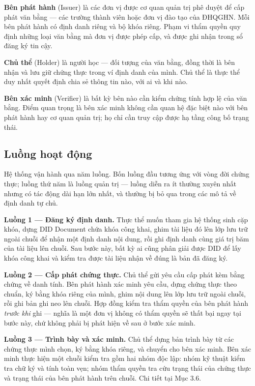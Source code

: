 \textbf{Bên phát hành} (Issuer) là các đơn vị được cơ quan quản trị phê duyệt để cấp phát văn bằng --- các trường thành viên hoặc đơn vị đào tạo của ĐHQGHN. Mỗi bên phát hành có định danh riêng và bộ khóa riêng. Phạm vi thẩm quyền quy định những loại văn bằng mà đơn vị được phép cấp, và được ghi nhận trong sổ đăng ký tin cậy.

\textbf{Chủ thể} (Holder) là người học --- đối tượng của văn bằng, đồng thời là bên nhận và lưu giữ chứng thực trong ví định danh của mình. Chủ thể là thực thể duy nhất quyết định chia sẻ thông tin nào, với ai và khi nào.

\textbf{Bên xác minh} (Verifier) là bất kỳ bên nào cần kiểm chứng tính hợp lệ của văn bằng. Điểm quan trọng là bên xác minh không cần quan hệ đặc biệt nào với bên phát hành hay cơ quan quản trị; họ chỉ cần truy cập được hạ tầng công bố trạng thái.

\subsection{Luồng hoạt động}

Hệ thống vận hành qua năm luồng. Bốn luồng đầu tương ứng với vòng đời chứng thực; luồng thứ năm là luồng quản trị --- luồng diễn ra ít thường xuyên nhất nhưng có tác động dài hạn lớn nhất, và thường bị bỏ qua trong các mô tả về định danh tự chủ.

\noindent \textbf{Luồng 1 --- Đăng ký định danh.} Thực thể muốn tham gia hệ thống sinh cặp khóa, dựng DID Document chứa khóa công khai, ghim tài liệu đó lên lớp lưu trữ ngoài chuỗi để nhận một định danh nội dung, rồi ghi định danh cùng giá trị băm của tài liệu lên chuỗi. Sau bước này, bất kỳ ai cũng phân giải được DID để lấy khóa công khai và kiểm tra được tài liệu nhận về đúng là bản đã đăng ký.

\noindent \textbf{Luồng 2 --- Cấp phát chứng thực.} Chủ thể gửi yêu cầu cấp phát kèm bằng chứng về danh tính. Bên phát hành xác minh yêu cầu, dựng chứng thực theo chuẩn, ký bằng khóa riêng của mình, ghim nội dung lên lớp lưu trữ ngoài chuỗi, rồi ghi bản ghi neo lên chuỗi. Hợp đồng kiểm tra thẩm quyền của bên phát hành \emph{trước khi} ghi --- nghĩa là một đơn vị không có thẩm quyền sẽ thất bại ngay tại bước này, chứ không phải bị phát hiện về sau ở bước xác minh.

\noindent \textbf{Luồng 3 --- Trình bày và xác minh.} Chủ thể dựng bản trình bày từ các chứng thực mình chọn, ký bằng khóa riêng, và chuyển cho bên xác minh. Bên xác minh thực hiện một chuỗi kiểm tra gồm hai nhóm độc lập: nhóm kỹ thuật kiểm tra chữ ký và tính toàn vẹn; nhóm thẩm quyền tra cứu trạng thái của chứng thực và trạng thái của bên phát hành trên chuỗi. Chi tiết tại Mục 3.6.


